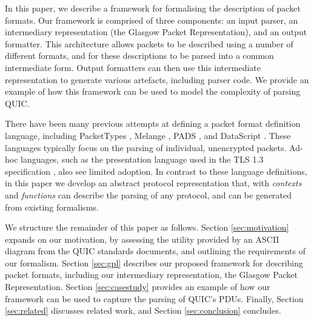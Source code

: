\documentclass[10pt,sigconf]{acmart}
\begin{document}
In this paper, we describe a framework for formalising the description of packet formats.
Our framework is comprised of three components: an input parser, an intermediary
representation (the Glasgow Packet Representation), and an output formatter. This
architecture allows packets to be described using a number of different formats, and for
these descriptions to be parsed into a common intermediate form. Output formatters can then
use this intermediate representation to generate various artefacts, including parser code.
We provide an example of how this framework can be used to model the complexity of parsing
QUIC.


There have been many previous attempts at defining a packet format definition language,
including PacketTypes \cite{mccann2000packet}, Melange \cite{madhavapeddy2007melange},
PADS \cite{fisher2005pads}, and DataScript \cite{back2002datascript}. These languages
typically focus on the parsing of individual, unencrypted packets. Ad-hoc languages, such
as the presentation language used in the TLS 1.3 specification
\cite{draft-ietf-tls-tls13-28}, also see limited adoption. In contrast to these language
definitions, in this paper we develop an abstract protocol representation that, with
\emph{contexts} and \emph{functions} can describe the parsing of any protocol, and can be
generated from existing formalisms.


We structure the remainder of this paper as follows. Section \ref{sec:motivation} expands
on our motivation, by assessing the utility provided by an ASCII diagram from the QUIC
standards documents, and outlining the requirements of our formalism. Section
\ref{sec:gpl} describes our proposed framework for describing packet formats,
including our intermediary representation, the Glasgow Packet Representation. Section
\ref{sec:casestudy} provides an example of how our framework can be used to capture
the parsing of QUIC's PDUs. Finally, Section \ref{sec:related} discusses
related work, and Section \ref{sec:conclusion} concludes.
\end{document}
